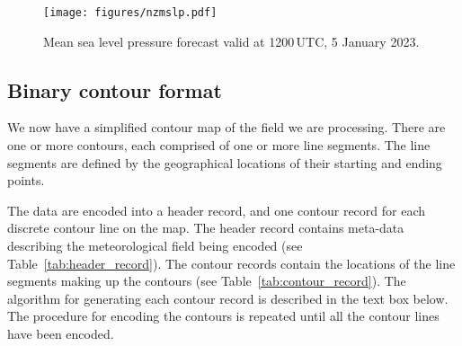 \documentclass[12pt,a4paper]{article}
\begin{document}
\begin{figure*}
\centering
\texttt{[image: figures/nzmslp.pdf]}
\caption{\label{fig:nzmslp}Mean sea level pressure forecast valid at
1200\,UTC, 5 January 2023.}
\end{figure*}

\subsection*{Binary contour format}

We now have a simplified contour map of the field we are processing. There are
one or more contours, each comprised of one or more line segments. The line
segments are defined by the geographical locations of their starting and ending
points.

The data are encoded into a header record, and one contour record for each
discrete contour line on the map. The header record contains meta-data
describing the meteorological field being encoded (see
Table~\ref{tab:header_record}). The contour records contain the locations of
the line segments making up the contours (see Table~\ref{tab:contour_record}).
The algorithm for generating each contour record is described in the text box
below. The procedure for encoding the contours is repeated until all the
contour lines have been encoded.
\end{document}
